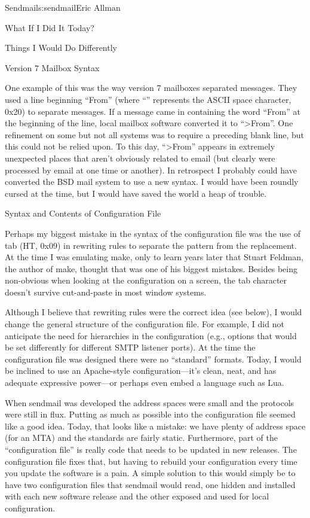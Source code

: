 \begin{aosachapter}{Sendmail}{s:sendmail}{Eric Allman}
\begin{aosasect1}{What If I Did It Today?}
\begin{aosasect2}{Things I Would Do Differently}
\begin{aosasect3}{Version 7 Mailbox Syntax}

One example of this was the way version 7 mailboxes separated
messages.  They used a line beginning ``From\textvisiblespace'' (where
``\textvisiblespace'' represents the ASCII space character, 0x20) to separate
messages. If a message came in containing the word ``From\textvisiblespace''
at the
beginning of the line, local mailbox software converted it to
``{\textgreater}From\textvisiblespace''.
One refinement on some but not all systems was
to require a preceding blank line, but this could not be relied
upon. To this day, ``{\textgreater}From'' appears in extremely
unexpected places that aren't obviously related to email (but clearly
were processed by email at one time or another). In retrospect I
probably could have converted the BSD mail system to use a new syntax.
I would have been roundly cursed at the time, but I would have saved
the world a heap of trouble.

\end{aosasect3}

\begin{aosasect3}{Syntax and Contents of Configuration File}

Perhaps my biggest mistake in the syntax of the configuration file was
the use of tab (HT, 0x09) in rewriting rules
to separate the pattern from the
replacement.  At the time I was emulating make, only to learn years
later that Stuart Feldman, the author of make, thought that was one of
his biggest mistakes. Besides being non-obvious when looking at the
configuration on a screen, the tab character doesn't survive
cut-and-paste in most window systems.

Although I believe that rewriting rules were the correct idea (see
below), I would change the general structure of the configuration
file.  For example, I did not anticipate the need for hierarchies in
the configuration (e.g., options that would be set differently for
different SMTP listener ports). At the time the configuration file was
designed there were no ``standard'' formats. Today, I would be inclined
to use an Apache-style configuration---it's clean, neat, and has
adequate expressive power---or perhaps even embed a language such as Lua.

When sendmail was developed the address spaces were small and the
protocols were still in flux. Putting as much as possible into the
configuration file seemed like a good idea. Today, that looks like a
mistake: we have plenty of address space (for an MTA) and the
standards are fairly static.
Furthermore, part of the ``configuration file'' is really code
that needs to be updated in new releases.
The  configuration file fixes that,
but having to rebuild your configuration every time you update the software
is a pain.
A simple solution to this would simply be
to have two configuration files that sendmail would read, one hidden
and installed with each new software release and the other exposed and
used for local configuration.


\end{aosasect3}
\end{aosasect2}
\end{aosasect1}
\end{aosachapter}
